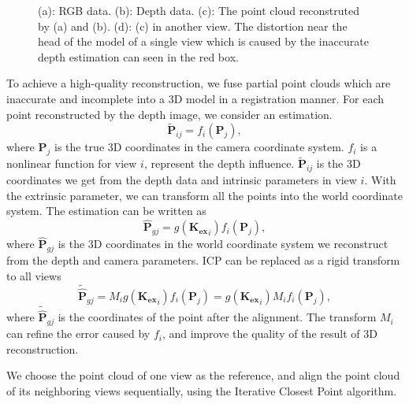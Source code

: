 {\begin{figure}[ht]
{\begin{minipage}[c]{.22\linewidth}
\end{minipage}
}
\caption{(a): RGB data. (b): Depth data. (c): The point cloud reconstruted by (a) and (b). (d): (c) in another view. The distortion near the head of the model of a single view which is caused by the inaccurate depth estimation can seen in the red box.}
\label{fig:deptherror}
\end{figure}


To achieve a high-quality reconstruction, we fuse partial point clouds which are inaccurate and incomplete into a 3D model in a registration manner.
%
For each point reconstructed by the depth image, we consider an estimation. 
\begin{equation}
\mathbf{\tilde{P}}_{ij}=f_{i}(\mathbf{P}_{j}),
\end{equation}
where $\mathbf{P}_{j}$ is the true 3D coordinates in the camera coordinate system. $f_{i}$ is a nonlinear function for view $i$, represent the depth influence. $\mathbf{\tilde{P}}_{ij}$ is the 3D coordinates we get from the depth data and intrinsic parameters in view $i$. With the extrinsic parameter, we can transform all the points into the world coordinate system. The estimation can be written as
\begin{equation}
\mathbf{\hat{P}}_{gj}=g(\mathbf{K_{ex}}_{i})f_{i}(\mathbf{P}_{j}),
\end{equation}
where $\mathbf{\hat{P}}_{gj}$ is the 3D coordinates in the world coordinate system we reconstruct from the depth and camera parameters. ICP can be replaced as a rigid transform to all views
\begin{equation}
\mathbf{\tilde{\hat{P}}}_{gj}=M_{i}g(\mathbf{K_{ex}}_{i})f_{i}(\mathbf{P}_{j})=g(\mathbf{K_{ex}}_{i})M_{i}f_{i}(\mathbf{P}_{j}),
\end{equation}
where $\mathbf{\tilde{\hat{P}}}_{gj}$ is the coordinates of the point after the alignment. The transform $M_{i}$ can refine the error caused by $f_{i}$, and improve the quality of the result of 3D reconstruction.
}%


We choose the point cloud of one view as the reference, and align the point cloud of its neighboring views sequentially, using the Iterative Closest Point algorithm. 

 
